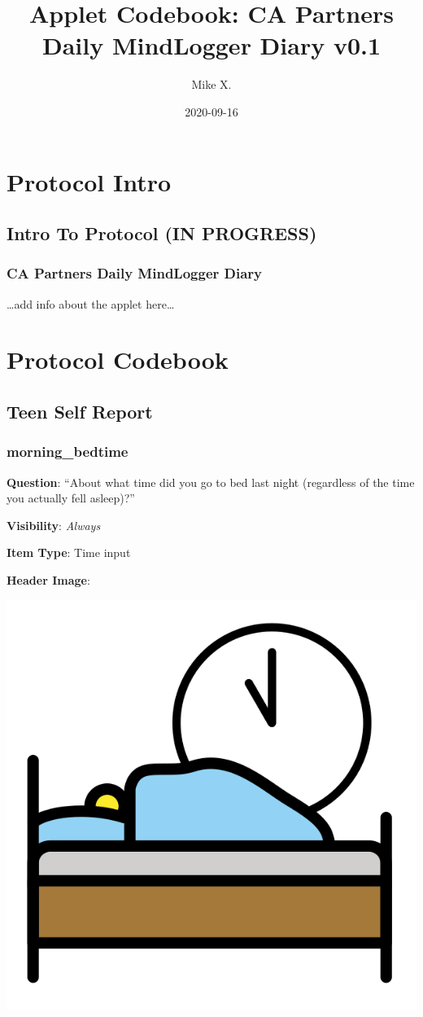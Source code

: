 \documentclass[]{book}
\title{Applet Codebook: CA Partners Daily MindLogger Diary v0.1}
\author{Mike X.}
\date{2020-09-16}
\begin{document}
\maketitle

{
\setcounter{tocdepth}{1}
\tableofcontents
}
\hypertarget{part-protocol-intro}{%
\part{Protocol Intro}\label{part-protocol-intro}}

\hypertarget{intro}{%
\chapter*{Intro To Protocol (IN PROGRESS)}\label{intro}}

\hypertarget{ca-partners-daily-mindlogger-diary}{%
\section{CA Partners Daily MindLogger Diary}\label{ca-partners-daily-mindlogger-diary}}

\ldots{}add info about the applet here\ldots{}

\hypertarget{part-protocol-codebook}{%
\part{Protocol Codebook}\label{part-protocol-codebook}}

\hypertarget{teen_section}{%
\chapter{Teen Self Report}\label{teen_section}}

\hypertarget{morning_bedtime}{%
\section{morning\_bedtime}\label{morning_bedtime}}

\textbf{Question}: ``About what time did you go to bed last night (regardless of the time you actually fell asleep)?''

\textbf{Visibility}: \emph{Always}

\textbf{Item Type}: Time input

\textbf{Header Image}:

\begin{flushleft}\includegraphics[width=0.33\linewidth]{downloadFigs4latex_ca_partners_applet_codebook/morning_bedtime_headerImg} \end{flushleft}
\end{document}
